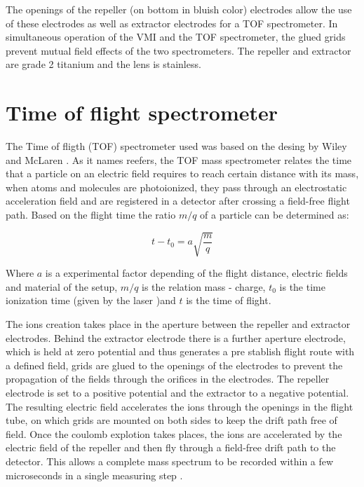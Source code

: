 The openings of the repeller (on bottom in bluish color) electrodes allow the use of these electrodes as well as extractor electrodes for a TOF spectrometer. In simultaneous operation of the VMI and the TOF spectrometer, the glued grids prevent mutual field effects of the two spectrometers.  The repeller and extractor are grade 2 titanium and the lens is stainless.

\section{Time of flight spectrometer}

The Time of fligth (TOF) spectrometer used was based on the desing by Wiley and McLaren \cite{wiley_timeflight_1955}. As it names reefers, the TOF mass spectrometer relates the time that a particle on an electric field requires to reach certain distance with its mass,  when atoms and molecules are photoionized,  they pass through an electrostatic acceleration field and are registered in a detector after crossing a field-free flight path. Based on the flight time the ratio $m/q$ of a particle can be determined as:

\begin{equation}
t-t_{0}=a\sqrt{\frac{m}{q}}
\end{equation}

Where $a$ is a experimental factor depending of the flight distance, electric fields and material of the setup,  $m/q$ is the relation mass - charge, $t_{0}$ is the time ionization time (given by the laser )and $t$ is the time of flight.

The ions creation takes place in the aperture between the repeller and extractor electrodes. Behind the extractor electrode there is a further aperture electrode, which is held at zero potential and thus generates a pre stablish flight route with a defined field, grids are glued to the openings of the electrodes to prevent the propagation of the fields through the orifices in the electrodes. The repeller electrode is set to a positive potential and the extractor to a negative potential. The resulting electric field accelerates the ions through the openings in the flight tube, on which grids are mounted on both sides to keep the drift path free of field.
Once the coulomb explotion takes places, the ions are accelerated by the electric field of the repeller and then fly through a field-free drift path to the detector. This allows a complete mass spectrum to be recorded within a few microseconds in a single measuring step \cite{mobius_time--flight_2016}.

